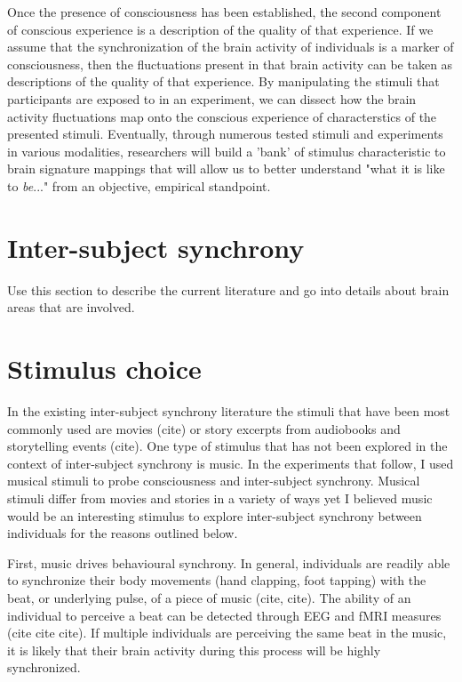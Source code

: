 Once the presence of consciousness has been established, the second component of conscious experience is a description of the quality of that experience. 
If we assume that the synchronization of the brain activity of individuals is a marker of consciousness, then the fluctuations present in that brain activity can be taken as descriptions of the quality of that experience.
By manipulating the stimuli that participants are exposed to in an experiment, we can dissect how the brain activity fluctuations map onto the conscious experience of characterstics of the presented stimuli.
Eventually, through numerous tested stimuli and experiments in various modalities, researchers will build a 'bank' of stimulus characteristic to brain signature mappings that will allow us to better understand "what it is like to \textit{be}..." from an objective, empirical standpoint. 
\section{Inter-subject synchrony}
Use this section to describe the current literature and go into details about brain areas that are involved.
\section{Stimulus choice}
In the existing inter-subject synchrony literature the stimuli that have been most commonly used are movies (cite) or story excerpts from audiobooks and storytelling events (cite). 
One type of stimulus that has not been explored in the context of inter-subject synchrony is music.
In the experiments that follow, I used musical stimuli to probe consciousness and inter-subject synchrony. 
Musical stimuli differ from movies and stories in a variety of ways yet I believed music would be an interesting stimulus to explore inter-subject synchrony between individuals for the reasons outlined below.
 
First, music drives behavioural synchrony. 
In general, individuals are readily able to synchronize their body movements (hand clapping, foot tapping) with the beat, or underlying pulse, of a piece of music (cite, cite). 
The ability of an individual to perceive a beat can be detected through EEG and fMRI measures (cite cite cite). 
If multiple individuals are perceiving the same beat in the music, it is likely that their brain activity during this process will be highly synchronized.

